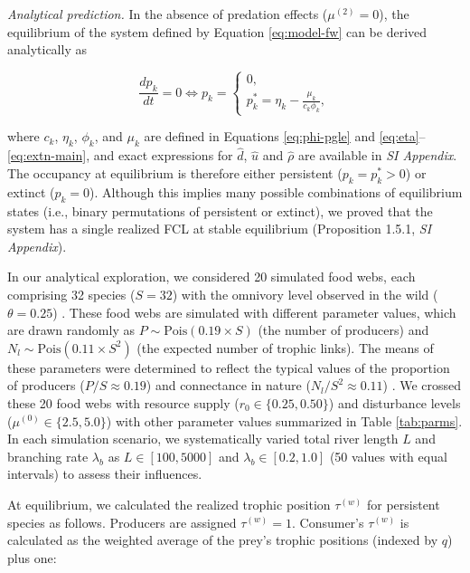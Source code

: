 \documentclass[11pt, class=article, crop=false]{standalone}
\theoremstyle{definition}
\begin{document}
\textit{Analytical prediction.} In the absence of predation effects ($\mu^{(2)} = 0$), the equilibrium of the system defined by Equation \ref{eq:model-fw} can be derived analytically as

\begin{equation}
    \frac{dp_k}{dt} = 0 
    \Leftrightarrow 
    p_k 
    = 
    \begin{cases}
         0,\\
         p_{k}^{*} = \eta_k - \frac{\mu_k}{c_k \phi_k}, 
    \end{cases}
\end{equation}

where $c_k$, $\eta_k$, $\phi_k$, and $\mu_k$ are defined in Equations \ref{eq:phi-pgle} and \ref{eq:eta}--\ref{eq:extn-main}, and exact expressions for $\hat{d}$, $\hat{u}$ and $\hat{\rho}$ are available in \textit{SI Appendix}.
The occupancy at equilibrium is therefore either persistent ($p_k = p_k^* > 0$) or extinct ($p_k = 0$).
Although this implies many possible combinations of equilibrium states (i.e., binary permutations of persistent or extinct), we proved that the system has a single realized FCL at stable equilibrium (Proposition 1.5.1, \textit{SI Appendix}).

In our analytical exploration, we considered 20 simulated food webs, each comprising 32 species ($S = 32$) with the omnivory level observed in the wild ($\theta = 0.25$) \cite{johnson_trophic_2014}.
These food webs are simulated with different parameter values, which are drawn randomly as $P \sim \mbox{Pois}(0.19 \times S)$ (the number of producers) and $N_l \sim \mbox{Pois}(0.11 \times S^2)$ (the expected number of trophic links).
The means of these parameters were determined to reflect the typical values of the proportion of producers ($P / S \approx 0.19$) \citep{briand_community_1984} and connectance in nature ($N_l / S^2 \approx 0.11$) \citep{dunne_food-web_2002}.
We crossed these 20 food webs with resource supply ($r_0 \in \{0.25, 0.50\}$) and disturbance levels ($\mu^{(0)} \in \{2.5, 5.0\}$) with other parameter values summarized in Table \ref{tab:parms}.
In each simulation scenario, we systematically varied total river length $L$ and branching rate $\lambda_b$ as $L \in [100, 5000]$ and $\lambda_b \in [0.2, 1.0]$ (50 values with equal intervals) to assess their influences.

At equilibrium, we calculated the realized trophic position $\tau^{(w)}$ for persistent species as follows.
Producers are assigned $\tau^{(w)} = 1$.
Consumer's $\tau^{(w)}$ is calculated as the weighted average of the prey's trophic positions (indexed by $q$) plus one:
\end{document}
